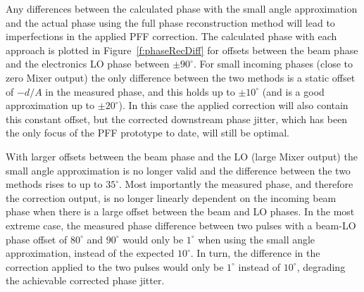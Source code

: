 Any differences between the calculated phase with the small angle
approximation and the actual phase using the full phase reconstruction
 method will lead to imperfections in the applied PFF correction.
The calculated phase with each approach is plotted in Figure~\ref{f:phaseRecDiff} for offsets between the beam phase and the electronics LO phase between \(\pm90^\circ\). For small incoming phases (close to zero Mixer output) the only difference between the two methods is a static offset of \(-d/A\) in the measured phase, and this holds up to \(\pm10^\circ\) (and is a good approximation up to \(\pm20^\circ\)). In this case the applied correction will also contain this constant offset, but the corrected downstream phase jitter, which has been the only focus of the PFF prototype to date, will still be optimal. 

With larger offsets between the beam phase and the LO (large Mixer output) the small angle approximation is no longer valid and the difference between the two methods rises to up to \(35^\circ\). Most importantly the measured phase, and therefore the correction output, is no longer linearly dependent on the incoming beam phase when there is a large offset between the beam and LO phases. In the most extreme case, the measured phase difference between two pulses with a beam-LO phase offset of \(80^\circ\) and \(90^\circ\) would only be \(1^\circ\) when using the small angle approximation, instead of the expected \(10^\circ\). In turn, the difference in the correction applied to the two pulses would only be \(1^\circ\) instead of \(10^\circ\), degrading the achievable corrected phase jitter.


